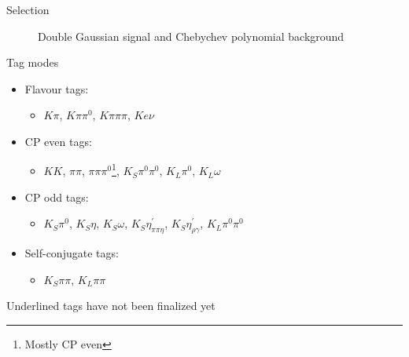 \documentclass{beamer}
\begin{document}
\begin{frame}{Selection}
\begin{figure}
\begin{subfigure}{0.5\textwidth}
    \end{subfigure}
    \caption{Double Gaussian signal and Chebychev polynomial background}
  \end{figure}
\end{frame}

\renewcommand*{\thefootnote}{\fnsymbol{footnote}}
\begin{frame}{Tag modes}
  \begin{itemize}
    \setlength\itemsep{1.0em}
    \item{Flavour tags:}
    \begin{itemize}
      \item{$K\pi$, $K\pi\pi^0$, $K\pi\pi\pi$, \underline{$Ke\nu$}}
    \end{itemize}
    \item{CP even tags:}
    \begin{itemize}
      \item{$KK$, $\pi\pi$, $\pi\pi\pi^0$\footnote{Mostly CP even}, $K_S\pi^0\pi^0$, $K_L\pi^0$, \underline{$K_L\omega$}}
    \end{itemize}
    \item{CP odd tags:}
    \begin{itemize}
      \item{$K_S\pi^0$, $K_S\eta$, $K_S\omega$, $K_S\eta^\prime_{\pi\pi\eta}$, $K_S\eta^\prime_{\rho\gamma}$, \underline{$K_L\pi^0\pi^0$}}
    \end{itemize}
    \item{Self-conjugate tags:}
    \begin{itemize}
      \item{$K_S\pi\pi$, $K_L\pi\pi$}
    \end{itemize}
  \end{itemize}
  Underlined tags have not been finalized yet
\end{frame}
\end{document}
